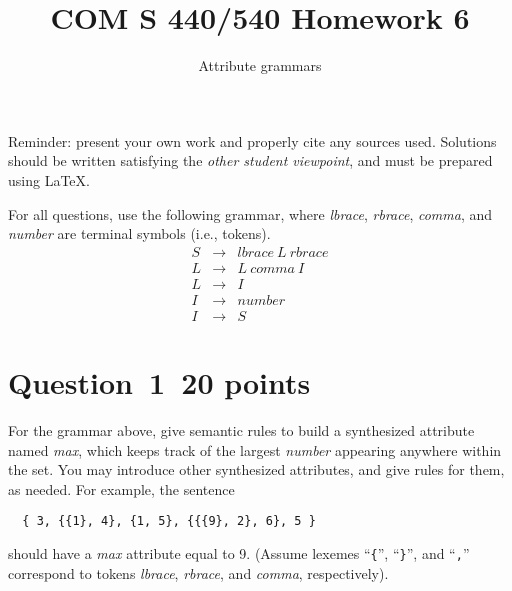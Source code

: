 \documentclass[10pt]{article}
\title{COM S 440/540 Homework 6}
\date{}
\author{Attribute grammars}
\begin{document}
\maketitle

\noindent
Reminder: present your own work and properly cite any sources used.
Solutions should be written satisfying the \emph{other student viewpoint},
and must be prepared using \LaTeX.
\renewcommand{\thepage}{~}
 
 
For all questions, use the following grammar, where
\emph{lbrace}, \emph{rbrace}, \emph{comma}, and \emph{number}
are terminal symbols (i.e., tokens).
\begin{eqnarray}
  S & \rightarrow & \mathit{lbrace} ~L~ \mathit{rbrace}
\\
  L & \rightarrow & L ~\mathit{comma}~ I
\\
  L & \rightarrow & I
\\
  I & \rightarrow & \mathit{number}
\\
  I & \rightarrow & S
\end{eqnarray}


\section*{Question~1~\hfill 20 points}

For the grammar above, give semantic rules to build
a synthesized attribute named \emph{max},
which keeps track of the largest \emph{number} appearing anywhere
within the set.
You may introduce other synthesized attributes,
and give rules for them,
as needed.
For example, the sentence
\begin{verbatim}
  { 3, {{1}, 4}, {1, 5}, {{{9}, 2}, 6}, 5 }
\end{verbatim}
should have a \emph{max} attribute equal to 9.
(Assume lexemes ``\verb|{|'', ``\verb|}|'', and ``\verb|,|''
correspond to tokens \emph{lbrace}, \emph{rbrace},
and \emph{comma}, respectively).

\end{document}
